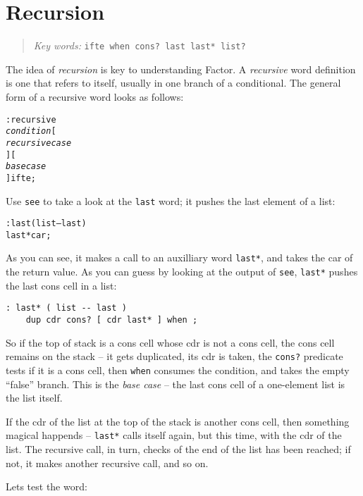 \documentclass[english]{book}
\newcommand{\chapkeywords}[1]{%
\begin{quote}
\emph{Key words:} \texttt{#1}
\end{quote}
}
\begin{document}
\section{Recursion}

\chapkeywords{ifte when cons?~last last* list?}

The idea of \emph{recursion} is key to understanding Factor. A \emph{recursive} word definition is one that refers to itself, usually in one branch of a conditional. The general form of a recursive word looks as follows:

\begin{alltt}
: recursive
    \emph{condition} {[}
        \emph{recursive case}
    {] [}
        \emph{base case}
    {]} ifte ;
\end{alltt}

Use \texttt{see} to take a look at the \texttt{last} word; it pushes the last element of a list:

\begin{alltt}
: last ( list -- last )
    last* car ;
\end{alltt}

As you can see, it makes a call to an auxilliary word \texttt{last*}, and takes the car of the return value. As you can guess by looking at the output of \texttt{see}, \texttt{last*} pushes the last cons cell in a list:

\begin{verbatim}
: last* ( list -- last )
    dup cdr cons? [ cdr last* ] when ;
\end{verbatim}

So if the top of stack is a cons cell whose cdr is not a cons cell, the cons cell remains on the stack -- it gets duplicated, its cdr is taken, the \texttt{cons?} predicate tests if it is a cons cell, then \texttt{when} consumes the condition, and takes the empty ``false'' branch. This is the \emph{base case} -- the last cons cell of a one-element list is the list itself.

If the cdr of the list at the top of the stack is another cons cell, then something magical happends -- \texttt{last*} calls itself again, but this time, with the cdr of the list. The recursive call, in turn, checks of the end of the list has been reached; if not, it makes another recursive call, and so on.

Lets test the word:
\end{document}
